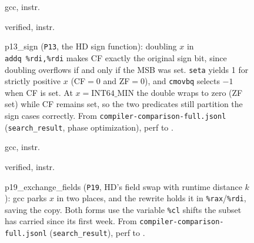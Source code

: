 \documentclass[journal,10pt]{IEEEtran}
\begin{document}
\begin{figure}[!t]
\centering
\begin{minipage}[t]{0.47\columnwidth}
\centering\tiny gcc, \GccLenPthirteen{} instr.\par\vspace{1pt}

\end{minipage}\hfill
\begin{minipage}[t]{0.47\columnwidth}
\centering\tiny verified, \OursLenPthirteen{} instr.\par\vspace{1pt}

\end{minipage}
\caption{p13\_sign (\texttt{P13}, the HD sign function): doubling $x$
in \texttt{addq}~\texttt{\%rdi,\%rdi} makes CF exactly the original
sign bit, since doubling overflows if and only if the MSB was set.
\texttt{seta} yields 1 for strictly positive $x$ (CF$=0$ and ZF$=0$),
and \texttt{cmovbq} selects $-1$ when CF is set. At
$x=\mathrm{INT64\_MIN}$ the double wraps to zero (ZF set) while CF
remains set, so the two predicates still partition the sign cases
correctly. From \texttt{compiler-comparison-full.jsonl} (\texttt{search\_result},
phase optimization), perf \SpecPerfPthirteen{} to \PerfPthirteen{}.}
\label{fig:win-p13}
\end{figure}

\begin{figure}[!t]
\centering
\begin{minipage}[t]{0.47\columnwidth}
\centering\tiny gcc, \GccLenPnineteen{} instr.\par\vspace{1pt}

\end{minipage}\hfill
\begin{minipage}[t]{0.47\columnwidth}
\centering\tiny verified, \OursLenPnineteen{} instr.\par\vspace{1pt}

\end{minipage}
\caption{p19\_exchange\_fields (\texttt{P19}, HD's field swap with
runtime distance $k$): gcc parks $x$ in two places, and the rewrite
holds it in \texttt{\%rax}/\texttt{\%rdi}, saving the copy. Both forms
use the variable \texttt{\%cl} shifts the subset has carried since its
first week. From \texttt{compiler-comparison-full.jsonl} (\texttt{search\_result}),
perf \SpecPerfPnineteen{} to \PerfPnineteen{}.}
\label{fig:win-p19}
\end{figure}
\end{document}
